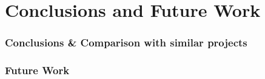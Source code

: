 \section{Conclusions and Future Work}

\begin{frame}
\frametitle{Conclusions \& Comparison with similar projects}
\end{frame}

\begin{frame}
\frametitle{Future Work}
\end{frame}